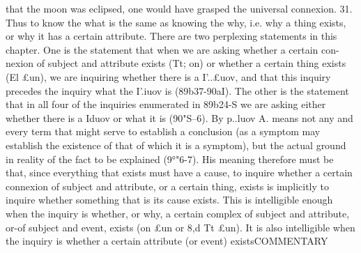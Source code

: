 that the moon was eclipsed, one would have grasped the universal
connexion.
31. Thus to know the what is the same as knowing the why,
i.e. why a thing exists, or why it has a certain attribute.
There are two perplexing statements in this chapter. One is
the statement that when we are asking whether a certain con-
nexion of subject and attribute exists (Tt; on) or whether a certain
thing exists (El £un), we are inquiring whether there is a I'..£uov,
and that this inquiry precedes the inquiry what the I'.iuov is
(89b37-90aI). The other is the statement that in all four of the
inquiries enumerated in 89b24-S we are asking either whether
there is a Iduov or what it is (90"S--6). By p..luov A. means not any
and every term that might serve to establish a conclusion (as
a symptom may establish the existence of that of which it is
a symptom), but the actual ground in reality of the fact to be
explained (9°"6-7). His meaning therefore must be that, since
everything that exists must have a cause, to inquire whether
a certain connexion of subject and attribute, or a certain thing,
exists is implicitly to inquire whether something that is its cause
exists. This is intelligible enough when the inquiry is whether,
or why, a certain complex of subject and attribute, or-of subject
and event, exists (on £un or 8,d Tt £un). It is also intelligible
when the inquiry is whether a certain attribute (or event) existsCOMMENTARY
